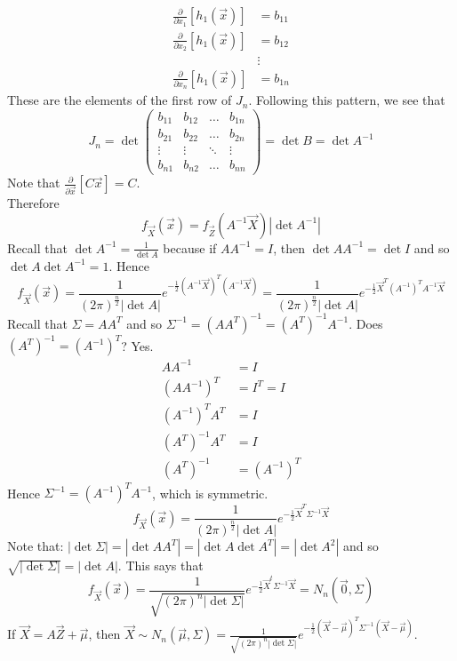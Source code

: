 \documentclass[12pt]{article}
\begin{document}
$$ \begin{aligned} \frac{\partial}{\partial x_1} [h_1(\vec{x})] &= b_{11} \\ \frac{\partial}{\partial x_2} [h_1(\vec{x})] &= b_{12} \\ &\vdots \\ \frac{\partial}{\partial x_n} [h_1(\vec{x})] &= b_{1n} \end{aligned} $$ These are the elements of the first row of $J_n$. Following this pattern, we see that 
$$ J_n = \det{ \begin{pmatrix} b_{11} & b_{12} & \dots & b_{1n} \\ b_{21} & b_{22} & \dots & b_{2n} \\ \vdots & \vdots & \ddots & \vdots \\ b_{n1} & b_{n2} & \dots & b_{nn} \end{pmatrix}} = \det{B} = \det{A^{-1}} $$ 
Note that $\frac{\partial}{\partial \vec{x}} [C\vec{x}] = C$. \\ Therefore 
$$ f_{\vec{X}}(\vec{x}) = f_{\vec{Z}}(A^{-1}\vec{X})|\det{A^{-1}}|$$
Recall that $\det{A^{-1}} = \frac{1}{\det{A}}$ because if $AA^{-1} = I$, then $\det{AA^{-1}} = \det{I}$ and so $\det{A}\det{A^{-1}} = 1$. Hence
$$ f_{\vec{X}}(\vec{x}) = \frac{1}{(2\pi)^{\frac{n}{2}}|\det{A}|} e^{-\frac{1}{2} (A^{-1}\vec{X})^T(A^{-1}\vec{X})} = \frac{1}{(2\pi)^{\frac{n}{2}}|\det{A}|} e^{-\frac{1}{2} \vec{X}^T(A^{-1})^TA^{-1}\vec{X}} $$ 
Recall that $\Sigma = AA^T$ and so $\Sigma^{-1} = (AA^T)^{-1} = (A^T)^{-1}A^{-1}$. Does $(A^T)^{-1} = (A^{-1})^T$? Yes. $$ \begin{aligned} AA^{-1} &= I \\ (AA^{-1})^T &= I^T = I \\ (A^{-1})^TA^T &= I \\ (A^T)^{-1}A^T &= I \\ (A^T)^{-1} &= (A^{-1})^T \end{aligned} $$ 
Hence $\Sigma^{-1} = (A^{-1})^TA^{-1}$, which is symmetric. 
$$ f_{\vec{X}}(\vec{x}) = \frac{1}{(2\pi)^{\frac{n}{2}}|\det{A}|} e^{-\frac{1}{2}\vec{X}^T \Sigma^{-1}\vec{X}} $$ 
Note that: $|\det{\Sigma}| = |\det{AA^T}| = |\det{A}\det{A^T}| = |\det{A}^2|$ and so $\sqrt{|\det{\Sigma}|} = |\det{A}|$. This says that 
$$f_{\vec{X}}(\vec{x}) = \frac{1}{\sqrt{(2\pi)^n |\det{\Sigma}|}} e^{-\frac{1}{2} \vec{X}^t\Sigma^{-1}\vec{X}} = N_n(\vec{0}, \Sigma)$$ 
If $\vec{X} = A\vec{Z} + \vec{\mu}$, then $\vec{X} \sim N_n(\vec{\mu}, \Sigma) = \frac{1}{\sqrt{(2\pi)^n |\det{\Sigma}|}} e^{-\frac{1}{2}(\vec{X} - \vec{\mu})^T\Sigma^{-1}(\vec{X} - \vec{\mu})} $. \\
\end{document}
